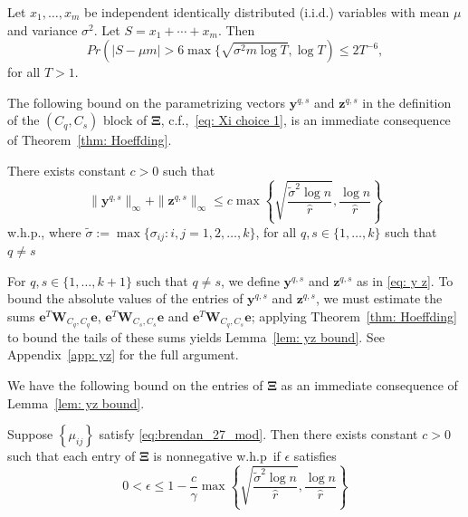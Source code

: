 \documentclass[twoside,11pt]{article}
\newcommand{\e}{\bs {e}}
\newcommand{\bs}{\boldsymbol}
\newcommand{\y}{\bs {y}}
\newcommand{\W}{\bs {W}}
\newcommand{\z}{\bs{z}}
\newcommand{\0}{\bs{0}}
\newcommand{\bra}[1]{\ensuremath{\left\{ #1 \right\}}} %
\newcommand{\iid}{independent identically distributed (i.i.d.) }
\begin{document}
{\begin{theorem}
	\label{thm: Hoeffding}
	Let $x_1, \dots, x_m$ be \iid variables with mean $\mu$
	and variance $\sigma^2$.
	Let $S = x_1 + \cdots + x_m$. Then
	\begin{equation}
	\label{eq:hoeffding}
	Pr( |S - \mu m| > 6 \max \{\sqrt{\sigma^2 m \log T}, \log T )
	 \le 2 T^{-6},
	\end{equation}
	for all $T > 1$.
\end{theorem}

The following bound
on the parametrizing vectors \(\y^{q,s}\) and \(\z^{q,s}\) in the definition of the \((C_q, C_s)\) block of \(\bs\Xi\), c.f.,~\eqref{eq: Xi choice 1},
is an immediate consequence of Theorem~\ref{thm: Hoeffding}.

\begin{lemma}
	\label{lem: yz bound}
	There exists constant $c > 0$ such that
	\begin{equation} \label{eq: yz bound}
		\|\bs{y}^{q,s}\|_{\infty} +  \|\bs{z}^{q,s}\|_{\infty} \leq
		c \max \bra{ \sqrt{ \frac{\tilde \sigma^2 \log n}{\hat r}} ,
			\frac{\log n}{\hat r} }
	\end{equation}
	w.h.p.,
	where $\tilde \sigma := \max \{ \sigma_{ij} : i,j = 1,2,\dots, k\}$,
	for all \(q,s \in \{1,\dots,k\}\) such that 	$q \neq s$
\end{lemma}

For \(q,s \in \{1,\dots, k+1\}\) such that \(q \neq s\), we define \(\y^{q,s}\) and \(\z^{q,s}\) as in \eqref{eq: y z}. To bound
the absolute values of the entries of \(\y^{q,s}\) and \(\z^{q,s}\), we must estimate the sums \(\e^T \W_{C_q, C_q} \e\),
\(\e^T \W_{C_s, C_s} \e \) and \(\e^T \W_{C_q, C_s} \e \); applying Theorem~\ref{thm: Hoeffding} to bound the tails
of these sums yields Lemma~\ref{lem: yz bound}. See Appendix~\ref{app: yz} for the full argument.

We have the following bound on the entries of \(\bs \Xi\) as an immediate consequence of  Lemma~\ref{lem: yz bound}.

\begin{proposition}
	\label{thm: Xi bound}
	Suppose $\bra{\mu_{ij}}$ satisfy \eqref{eq:brendan_27_mod}.
	Then there exists constant $c>0$ such that each entry of $\bs{\Xi}$ is nonnegative w.h.p~if \(\epsilon\) 	satisfies
	\begin{equation} \label{eq: xi eps}
	0 < \epsilon \leq
		1 - \frac{c}{\gamma}\max \bra{ \sqrt{ \frac{\tilde \sigma^2 \log n}{\hat r}} ,
			\frac{\log n}{\hat r}  }
	\end{equation}
\end{proposition}

}
\end{document}
